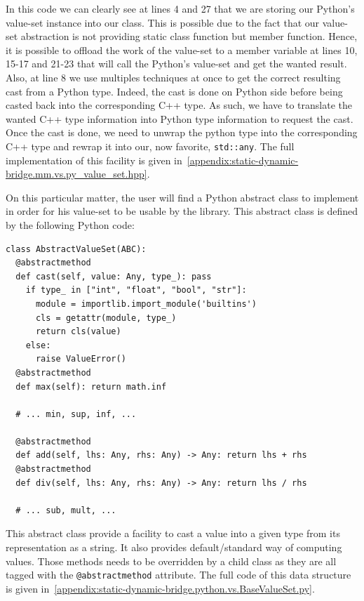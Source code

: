In this code we can clearly see at lines 4 and 27 that we are storing our Python's value-set instance into our class.
This is possible due to the fact that our value-set abstraction is not providing static class function but member
function. Hence, it is possible to offload the work of the value-set to a member variable at lines 10, 15-17 and 21-23
that will call the Python's value-set and get the wanted result. Also, at line 8 we use multiples techniques at once to
get the correct resulting cast from a Python type. Indeed, the cast is done on Python side before being casted back into
the corresponding C++ type. As such, we have to translate the wanted C++ type information into Python type information
to request the cast. Once the cast is done, we need to unwrap the python type into the corresponding C++ type and rewrap
it into our, now favorite, \texttt{std::any}. The full implementation of this facility is given
in~\cref{appendix:static-dynamic-bridge.mm.vs.py_value_set.hpp}.

On this particular matter, the user will find a Python abstract class to implement in order for his value-set to be
usable by the library. This abstract class is defined by the following Python code:

\begin{verbatim}
class AbstractValueSet(ABC):
  @abstractmethod
  def cast(self, value: Any, type_): pass
    if type_ in ["int", "float", "bool", "str"]:
      module = importlib.import_module('builtins')
      cls = getattr(module, type_)
      return cls(value)
    else:
      raise ValueError()
  @abstractmethod
  def max(self): return math.inf

  # ... min, sup, inf, ...

  @abstractmethod
  def add(self, lhs: Any, rhs: Any) -> Any: return lhs + rhs
  @abstractmethod
  def div(self, lhs: Any, rhs: Any) -> Any: return lhs / rhs

  # ... sub, mult, ...
\end{verbatim}

This abstract class provide a facility to cast a value into a given type from its representation as a string. It also
provides default/standard way of computing values. Those methods needs to be overridden by a child class as they are all
tagged with the \texttt{@abstractmethod} attribute. The full code of this data structure is given
in~\cref{appendix:static-dynamic-bridge.python.vs.BaseValueSet.py}.


